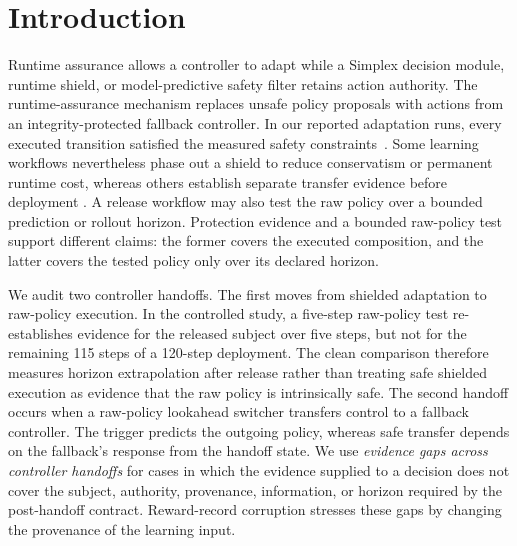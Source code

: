 \section{Introduction}

Runtime assurance allows a controller to adapt while a Simplex decision
module, runtime shield, or model-predictive safety filter retains action
authority.  The runtime-assurance mechanism replaces unsafe policy proposals with
actions from an integrity-protected fallback controller.  In our reported
adaptation runs, every executed transition satisfied the measured safety
constraints~\cite{seto_simplex_1998,alshiekh_shielding_2018,
wabersich_linear_mpsc_2018}.  Some learning workflows nevertheless phase out a
shield to reduce conservatism or permanent runtime cost, whereas others
establish separate transfer evidence before deployment
\cite{carr_partial_shielding_2023,hsu_sim_lab_real_2023}.  A release workflow
may also test the raw policy over a bounded prediction or rollout horizon.
Protection evidence and a bounded raw-policy test support different claims:
the former covers the executed composition, and the latter covers the tested
policy only over its declared horizon.

We audit two controller handoffs.  The first moves from shielded adaptation to
raw-policy execution.  In the controlled study, a five-step raw-policy test
re-establishes evidence for the released subject over five steps, but not for
the remaining 115 steps of a 120-step deployment.  The clean comparison
therefore measures horizon extrapolation after release rather than treating
safe shielded execution as evidence that the raw policy is intrinsically safe.
The second handoff occurs when a raw-policy lookahead switcher transfers control
to a fallback controller.  The trigger predicts the outgoing policy, whereas
safe transfer depends on the fallback's response from the handoff state.  We
use \emph{evidence gaps across controller handoffs} for cases in which the
evidence supplied to a decision does not cover the subject, authority,
provenance, information, or horizon required by the post-handoff contract.
Reward-record corruption stresses these gaps by changing the provenance of the
learning input.

